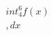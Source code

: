 \documentclass[preview]{standalone}
\begin{document}
\begin{align*}
\quad\\int_{4}^{6} f(x) \quad\\, dx
\end{align*}
\end{document}
